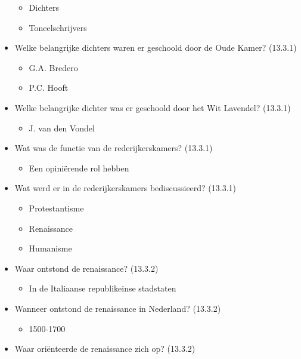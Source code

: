 \begin{itemize}
  \begin{itemize}
  \itemsep1pt\parskip0pt
  \item
    Dichters
  \item
    Toneelschrijvers
  \end{itemize}
\item
  Welke belangrijke dichters waren er geschoold door de Oude Kamer?
  (13.3.1)

  \begin{itemize}
  \itemsep1pt\parskip0pt
  \item
    G.A. Bredero
  \item
    P.C. Hooft
  \end{itemize}
\item
  Welke belangrijke dichter was er geschoold door het Wit Lavendel?
  (13.3.1)

  \begin{itemize}
  \itemsep1pt\parskip0pt
  \item
    J. van den Vondel
  \end{itemize}
\item
  Wat was de functie van de rederijkerskamers? (13.3.1)

  \begin{itemize}
  \itemsep1pt\parskip0pt
  \item
    Een opiniërende rol hebben
  \end{itemize}
\item
  Wat werd er in de rederijkerskamers bediscussieerd? (13.3.1)

  \begin{itemize}
  \itemsep1pt\parskip0pt
  \item
    Protestantisme
  \item
    Renaissance
  \item
    Humanisme
  \end{itemize}
\item
  Waar ontstond de renaissance? (13.3.2)

  \begin{itemize}
  \itemsep1pt\parskip0pt
  \item
    In de Italiaanse republikeinse stadstaten
  \end{itemize}
\item
  Wanneer ontstond de renaissance in Nederland? (13.3.2)

  \begin{itemize}
  \itemsep1pt\parskip0pt
  \item
    1500-1700
  \end{itemize}
\item
  Waar oriënteerde de renaissance zich op? (13.3.2)


\end{itemize}
